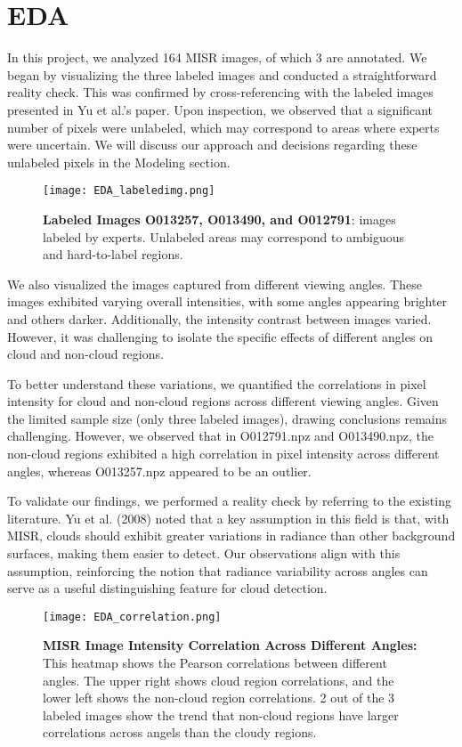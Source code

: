 \documentclass[10pt,letterpaper]{article}
\begin{document}
\section{EDA}
In this project, we analyzed 164 MISR images, of which 3 are annotated. We began by visualizing the three labeled images and conducted a straightforward reality check. This was confirmed by cross-referencing with the labeled images presented in Yu et al.'s paper. Upon inspection, we observed that a significant number of pixels were unlabeled, which may correspond to areas where experts were uncertain. We will discuss our approach and decisions regarding these unlabeled pixels in the Modeling section.
\begin{figure}[H] 
    \centering
    \texttt{[image: EDA\_labeledimg.png]}  %
    \caption{\textbf{Labeled Images O013257, O013490, and O012791}: images labeled by experts. Unlabeled areas may correspond to ambiguous and hard-to-label regions.}
    \label{fig:fig1}
\end{figure}


We also visualized the images captured from different viewing angles. These images exhibited varying overall intensities, with some angles appearing brighter and others darker. Additionally, the intensity contrast between images varied. However, it was challenging to isolate the specific effects of different angles on cloud and non-cloud regions.

To better understand these variations, we quantified the correlations in pixel intensity for cloud and non-cloud regions across different viewing angles. Given the limited sample size (only three labeled images), drawing  conclusions remains challenging. However, we observed that in O012791.npz and O013490.npz, the non-cloud regions exhibited a high correlation in pixel intensity across different angles, whereas O013257.npz appeared to be an outlier.

To validate our findings, we performed a reality check by referring to the existing literature. Yu et al. (2008) noted that a key assumption in this field is that, with MISR, clouds should exhibit greater variations in radiance than other background surfaces, making them easier to detect. Our observations align with this assumption, reinforcing the notion that radiance variability across angles can serve as a useful distinguishing feature for cloud detection.
\begin{figure}[H] 
    \centering
    \texttt{[image: EDA\_correlation.png]}  %
    \caption{\textbf{MISR Image Intensity Correlation Across Different Angles:} This heatmap shows the Pearson correlations between different angles. The upper right shows cloud region correlations, and the lower left shows the non-cloud region correlations. 2 out of the 3 labeled images show the trend that non-cloud regions have larger correlations across angels than the cloudy regions.}
    \label{fig:fig2}
\end{figure}
\end{document}
